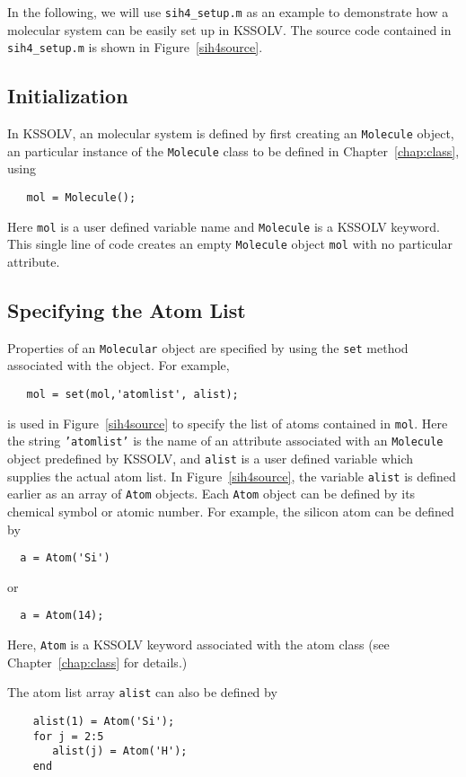\documentclass[11pt]{book}
\begin{document}
In the following, we will use {\tt sih4\_setup.m} as an example to demonstrate
how a molecular system can be easily set up in KSSOLV.  The source code
contained in {\tt sih4\_setup.m} is shown in Figure~\ref{sih4source}.

\subsection{Initialization}
In KSSOLV, an molecular system is defined by first creating an {\tt Molecule}
object, an particular instance of the {\tt Molecule} class to be defined in
Chapter~\ref{chap:class}, using
\begin{verbatim}
   mol = Molecule();
\end{verbatim}
Here {\tt mol} is a user defined variable name and {\tt Molecule} is a KSSOLV
keyword. This single line of code creates an empty {\tt Molecule} object
{\tt mol} with no particular attribute.

\subsection{Specifying the Atom List}  
Properties of an {\tt Molecular} object are specified by using the {\tt set}
method associated with the object. For example,
\begin{verbatim}
   mol = set(mol,'atomlist', alist); 
\end{verbatim}
is used in Figure~\ref{sih4source} to specify the list of atoms contained in
{\tt mol}.  Here the string {\tt 'atomlist'} is the name of an attribute
associated with an {\tt Molecule} object predefined by KSSOLV, and {\tt alist}
is a user defined variable which supplies the actual atom list.  In
Figure~\ref{sih4source}, the variable {\tt alist} is defined earlier as
an array of {\tt Atom} objects. Each {\tt Atom} object can be defined by 
its chemical symbol or atomic number. For example, the silicon atom can 
be defined by
\begin{verbatim}
  a = Atom('Si')
\end{verbatim}
or
\begin{verbatim}
  a = Atom(14); 
\end{verbatim}
Here, {\tt Atom} is a KSSOLV keyword associated with the atom class 
(see Chapter~\ref{chap:class} for details.)

The atom list array {\tt alist} can also be defined by
\begin{verbatim}
    alist(1) = Atom('Si');
    for j = 2:5
       alist(j) = Atom('H');
    end
\end{verbatim}
\end{document}
